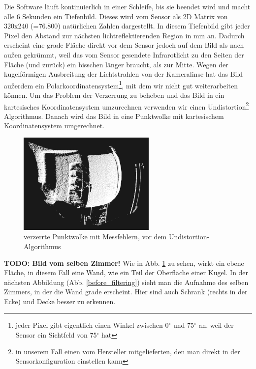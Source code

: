 \documentclass[a4paper,12pt,ngerman]{scrartcl}
\begin{document}
Die Software läuft kontinuierlich in einer Schleife, bis sie beendet wird und macht alle 6 Sekunden ein 
Tiefenbild. Dieses wird vom Sensor als 2D Matrix von 320x240 (=76.800) natürlichen Zahlen dargestellt.
In diesem Tiefenbild gibt jeder Pixel den Abstand zur nächsten lichtreflektierenden Region in mm an. 
Dadurch erscheint eine grade Fläche direkt vor dem Sensor jedoch auf dem Bild als nach außen gekrümmt, 
weil das vom Sensor gesendete Infrarotlicht zu den Seiten der Fläche (und zurück) ein bisschen länger
braucht, als zur Mitte. Wegen der kugelförmigen Ausbreitung der Lichtstrahlen von der Kameralinse hat das
Bild außerdem ein Polarkoordinatensystem\footnote{jeder Pixel gibt eigentlich einen Winkel zwischen
	0$^{\circ}$ und 75$^{\circ}$ an, weil der Sensor ein Sichtfeld von 75$^{\circ}$ hat}, mit dem wir nicht
gut weiterarbeiten können. Um das Problem der Verzerrung zu beheben und das Bild in ein kartesisches
Koordinatensystem umzurechnen verwenden wir einen Undistortion\footnote{in unserem Fall einen
	vom Hersteller mitgelieferten, den man direkt in der Sensorkonfiguration einstellen kann} Algorithmus. Danach wird das Bild in eine Punktwolke mit kartesischem Koordinatensystem umgerechnet.\par
\begin{figure}[h]
	\centering
	\includegraphics[width=0.6\textwidth]{distorted_pointcloud}
	\caption{verzerrte Punktwolke mit Messfehlern, vor dem Undistortion-Algorithmus}
	\label{distorted_pointcloud_img}
\end{figure}
\textbf{TODO: Bild vom selben Zimmer!}
Wie in Abb. \ref{distorted_pointcloud_img} zu sehen, wirkt ein ebene Fläche, in diesem Fall 
eine Wand, wie ein Teil der Oberfläche einer Kugel. In der nächsten Abbildung (Abb. \ref{before_filtering}) sieht
man die Aufnahme des selben Zimmers, in der die Wand grade erscheint. Hier sind auch
Schrank (rechts in der Ecke) und Decke besser zu erkennen. 
\end{document}
